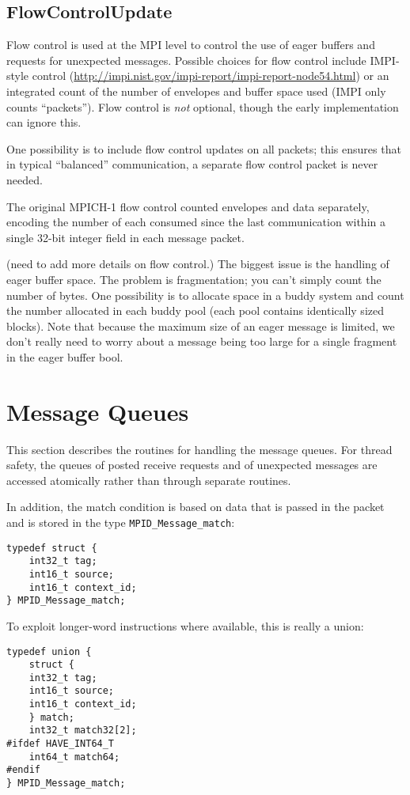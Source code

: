 \documentclass{article}
\def\code{\begingroup\makeustext\eatcode}
\def\eatcode#1{\texttt{#1}\endgroup}
\begin{document}
\subsection{FlowControlUpdate}

Flow control is used at the MPI level to control the use of eager buffers and
requests for unexpected messages.  Possible choices for flow control include
IMPI-style control
(\url{http://impi.nist.gov/impi-report/impi-report-node54.html}) or an
integrated count of the number of envelopes and 
buffer space used (IMPI only counts ``packets'').  Flow control is \emph{not}
optional, though the early 
implementation can ignore this.

One possibility is to include flow control updates on all packets; this
ensures that in typical ``balanced'' communication, a separate flow control
packet is never needed.  

The original MPICH-1 flow control counted envelopes and data
separately, encoding the number of each consumed since the last
communication within a single 32-bit integer field in each message
packet.  

(need to add more details on flow control.)  
The biggest issue is the
handling of eager buffer space.  The problem is fragmentation; you
can't simply count the number of bytes.  One possibility is to
allocate space in a buddy system and count the number allocated in
each buddy pool (each pool contains identically sized blocks).  Note
that because the maximum size of an eager message is limited, we don't
really need to worry about a message being too large for a single
fragment in the eager buffer bool.

\section{Message Queues}
This section describes the routines for handling the message queues.  For
thread safety, the queues of posted receive requests and of unexpected
messages are accessed atomically rather than through separate routines.

In addition, the match condition is based on data that is passed in the packet
and is stored in the type \code{MPID_Message_match}:
\begin{verbatim}
typedef struct {
    int32_t tag;
    int16_t source;
    int16_t context_id;
} MPID_Message_match;
\end{verbatim}
To exploit longer-word instructions where available, this is really a
union:
\begin{verbatim}
typedef union { 
    struct { 
    int32_t tag;
    int16_t source;
    int16_t context_id;
    } match;
    int32_t match32[2];
#ifdef HAVE_INT64_T
    int64_t match64;
#endif
} MPID_Message_match;
\end{verbatim}
\end{document}
